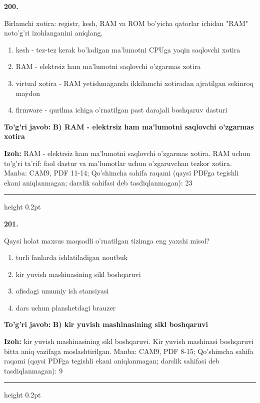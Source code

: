 \documentclass[10pt,a4paper]{article}
\begin{document}
{\bfseries\sffamily\color{ink} 200.}
\par
Birlamchi xotira: registr, kesh, RAM va ROM bo'yicha qatorlar ichidan "RAM" noto'g'ri izohlanganini aniqlang.
\begin{enumerate}[label=\Alph*),leftmargin=9mm]
\item kesh - tez-tez kerak bo'ladigan ma'lumotni CPUga yaqin saqlovchi xotira
\item RAM - elektrsiz ham ma'lumotni saqlovchi o'zgarmas xotira
\item virtual xotira - RAM yetishmaganda ikkilamchi xotiradan ajratilgan sekinroq maydon
\item firmware - qurilma ichiga o'rnatilgan past darajali boshqaruv dasturi
\end{enumerate}
\begin{tcolorbox}[enhanced,breakable,colback=teal!4,colframe=teal!60!black,boxrule=0.45pt,arc=1.2mm,left=2.7mm,right=2.7mm,top=1.8mm,bottom=1.8mm,before skip=2mm,after skip=2mm]
{\bfseries\sffamily\color{teal}To'g'ri javob:} \textbf{B) RAM - elektrsiz ham ma'lumotni saqlovchi o'zgarmas xotira}
\par\smallskip
{\bfseries Izoh:} RAM - elektrsiz ham ma'lumotni saqlovchi o'zgarmas xotira. RAM uchun to'g'ri ta'rif: faol dastur va ma'lumotlar uchun o'zgaruvchan tezkor xotira. Manba: CAM9, PDF 11-14; Qo'shimcha sahifa raqami (qaysi PDFga tegishli ekani aniqlanmagan; darslik sahifasi deb tasdiqlanmagan): 23
\end{tcolorbox}
\vspace{2mm}\hrule height 0.2pt\vspace{3mm}

{\bfseries\sffamily\color{ink} 201.}
\par
Qaysi holat maxsus maqsadli o'rnatilgan tizimga eng yaxshi misol?
\begin{enumerate}[label=\Alph*),leftmargin=9mm]
\item turli fanlarda ishlatiladigan noutbuk
\item kir yuvish mashinasining sikl boshqaruvi
\item ofisdagi umumiy ish stansiyasi
\item dars uchun planshetdagi brauzer
\end{enumerate}
\begin{tcolorbox}[enhanced,breakable,colback=teal!4,colframe=teal!60!black,boxrule=0.45pt,arc=1.2mm,left=2.7mm,right=2.7mm,top=1.8mm,bottom=1.8mm,before skip=2mm,after skip=2mm]
{\bfseries\sffamily\color{teal}To'g'ri javob:} \textbf{B) kir yuvish mashinasining sikl boshqaruvi}
\par\smallskip
{\bfseries Izoh:} kir yuvish mashinasining sikl boshqaruvi. Kir yuvish mashinasi boshqaruvi bitta aniq vazifaga moslashtirilgan. Manba: CAM9, PDF 8-15; Qo'shimcha sahifa raqami (qaysi PDFga tegishli ekani aniqlanmagan; darslik sahifasi deb tasdiqlanmagan): 9
\end{tcolorbox}
\vspace{2mm}\hrule height 0.2pt\vspace{3mm}
\end{document}
